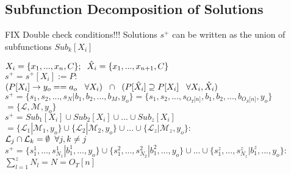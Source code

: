 \documentclass[11pt]{article}
\begin{document}
\subsection{Subfunction Decomposition of Solutions}
FIX Double check conditions!!!
Solutions $s^+$ can be written as the union of subfunctions $Sub_k[X_i]$
\begin{center}
$
X_i = \{x_1,...,x_n,C\}; \hspace{2mm} \hat{X}_i = \{x_1,...,x_{n+1},C\}
$
\\ \vspace{2mm}
$
s^+ = s^+[X_i] := P :
$
\\ \vspace{2mm}
$
(P \lbrack X_i \rbrack \rightarrow y_{o} == a_{o} \hspace{3mm} \forall X_i) \hspace{2mm} \cap \hspace{2mm} (P[\hat{X}_i] \supseteq P[X_i] \hspace{3mm} \forall X_i,\hat{X}_i)
$
\\ \vspace{4mm}
$
s^+ = \{ s_1,s_2,...,s_N|b_1,b_2,...,b_M,y_o\} = \{ s_1,s_2,...,s_{O_T \lbrack n \rbrack }, b_1, b_2,...,b_{O_S \lbrack n \rbrack},y_o \}
$
\\ \vspace{2mm}
$
= \{ \mathcal{L},\mathcal{M},y_o\}
$
\\ \vspace{4mm}
$
s^+ = Sub_1[X_i] \cup Sub_2[X_i] \cup ... \cup Sub_z[X_i]
$
\\ \vspace{3mm}
$
= \{ \mathcal{L}_1| \mathcal{M}_1,y_o\} \cup \{  \mathcal{L}_2| \mathcal{M}_2,y_o\} \cup ... \cup \{  \mathcal{L}_z| \mathcal{M}_z,y_o\} : 
$
\\ \vspace{2mm}
$
\mathcal{L}_j \cap \mathcal{L}_k = \emptyset \hspace{2mm} \forall j,k\neq j
$
\\ \vspace{4mm}
$
s^+ = \{ s_{1}^1,...,s^1_{N_1}| b^1_{1},...,y_o\} \cup \{  s_{1}^2,...,s^2_{N_2}| b^2_{1},...,y_o\} \cup ... \cup \{ s_{1}^z,...,s^z_{N_z}| b^z_{1},...,y_o\}:
$
\\ \vspace{2mm}
$
\sum_{l=1}^z N_l = N = O_T[n]
$
\end{center}
\end{document}
